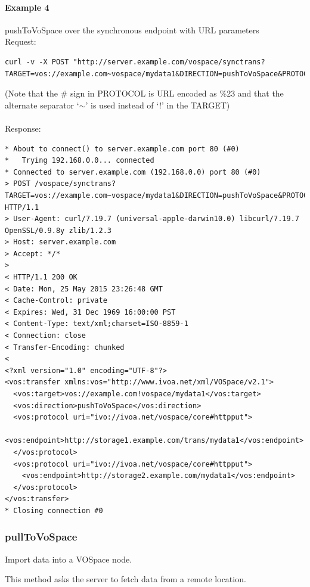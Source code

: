 \documentclass[11pt,a4paper]{ivoa}
\begin{document}
\paragraph{Example 4}
pushToVoSpace over the synchronous endpoint with URL parameters
\\[5px]
\noindent
Request:
\begin{lstlisting}
curl -v -X POST "http://server.example.com/vospace/synctrans?TARGET=vos://example.com~vospace/mydata1&DIRECTION=pushToVoSpace&PROTOCOL=ivo://ivoa.net/vospace/core%23httpput"
\end{lstlisting}
(Note that the \# sign in PROTOCOL is URL encoded as \%23 and that the alternate separator `$\mathtt{\sim}$' is used instead of `!' in the TARGET) \\
\\
Response:
\begin{lstlisting}
* About to connect() to server.example.com port 80 (#0)
*   Trying 192.168.0.0... connected
* Connected to server.example.com (192.168.0.0) port 80 (#0)
> POST /vospace/synctrans?TARGET=vos://example.com~vospace/mydata1&DIRECTION=pushToVoSpace&PROTOCOL=ivo://ivoa.net/vospace/core\%23httpput HTTP/1.1
> User-Agent: curl/7.19.7 (universal-apple-darwin10.0) libcurl/7.19.7 OpenSSL/0.9.8y zlib/1.2.3
> Host: server.example.com
> Accept: */*
>
< HTTP/1.1 200 OK
< Date: Mon, 25 May 2015 23:26:48 GMT
< Cache-Control: private
< Expires: Wed, 31 Dec 1969 16:00:00 PST
< Content-Type: text/xml;charset=ISO-8859-1
< Connection: close
< Transfer-Encoding: chunked
<
<?xml version="1.0" encoding="UTF-8"?>
<vos:transfer xmlns:vos="http://www.ivoa.net/xml/VOSpace/v2.1">
  <vos:target>vos://example.com!vospace/mydata1</vos:target>
  <vos:direction>pushToVoSpace</vos:direction>
  <vos:protocol uri="ivo://ivoa.net/vospace/core#httpput">
    <vos:endpoint>http://storage1.example.com/trans/mydata1</vos:endpoint>
  </vos:protocol>
  <vos:protocol uri="ivo://ivoa.net/vospace/core#httpput">
    <vos:endpoint>http://storage2.example.com/mydata1</vos:endpoint>
  </vos:protocol>
</vos:transfer>
* Closing connection #0
\end{lstlisting}

\subsubsection{pullToVoSpace}
\label{subsubsec:pulltovospace}
Import data into a VOSpace node.

This method asks the server to fetch data from a remote location.
\end{document}
